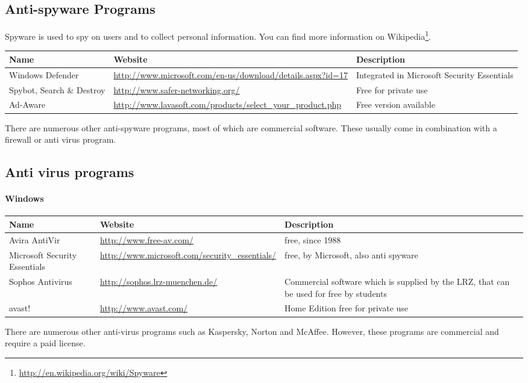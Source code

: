 \documentclass[a4paper,12pt]{scrartcl}
\begin{document}
\subsection*{Anti-spyware Programs}

Spyware is used to spy on users and to collect personal information. You can find more information on Wikipedia\footnote{\url{http://en.wikipedia.org/wiki/Spyware}}.

\begin{center}
	\begin{tabularx}{\linewidth}{|p{.18\linewidth}Xp{.3\linewidth}|}
		\hline
		Name & Website & Description\\
		\hline \hline
		Windows Defender & \url{http://www.microsoft.com/en-us/download/details.aspx?id=17} & Integrated in Microsoft Security Essentials\\
		\hline
		Spybot, Search \& Destroy & \url{http://www.safer-networking.org/} & Free for private use\\
		\hline
		Ad-Aware & \url{http://www.lavasoft.com/products/select\_your\_product.php} & Free version available\\
		\hline
	\end{tabularx}
\end{center}
There are numerous other anti-spyware programs, most of which are commercial software. These usually come in combination with a firewall or anti virus program.

\subsection*{Anti virus programs}
\paragraph*{Windows}
\begin{center}
  \begin{tabularx}{\linewidth}{|p{.2\linewidth}XX|}
    \hline
    Name & Website & Description\\
    \hline \hline
    Avira AntiVir & \url{http://www.free-av.com/} & free, since 1988\\
    \hline
    Microsoft Security Essentials & \url{http://www.microsoft.com/security\_essentials/} & free, by Microsoft, also anti spyware\\
    \hline
    Sophos Antivirus & \url{http://sophos.lrz-muenchen.de/} & Commercial software which is supplied by the LRZ, that can be used for free by students\\
    \hline
    avast! & \url{http://www.avast.com/} & Home Edition free for private use\\
    \hline
  \end{tabularx}
\end{center}
There are numerous other anti-virus programs such as Kaspersky, Norton and McAffee. However, these programs are commercial and require a paid license.
\\
\end{document}
